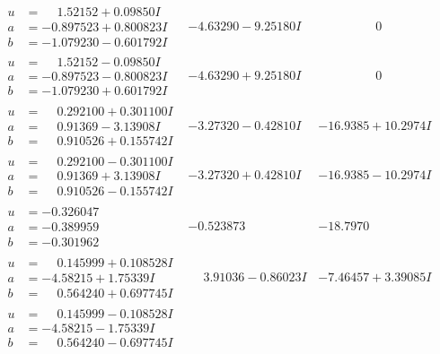 \documentclass[1p]{elsarticle_modified}
\theoremstyle{definition}
\begin{document}
$$\begin{array}{c|c|c}
\begin{aligned}
u &= \phantom{-}1.52152 + 0.09850 I \\
a &= -0.897523 + 0.800823 I \\
b &= -1.079230 - 0.601792 I\end{aligned}
 & -4.63290 - 9.25180 I & \phantom{-0.000000 } 0 \\ \hline\begin{aligned}
u &= \phantom{-}1.52152 - 0.09850 I \\
a &= -0.897523 - 0.800823 I \\
b &= -1.079230 + 0.601792 I\end{aligned}
 & -4.63290 + 9.25180 I & \phantom{-0.000000 } 0 \\ \hline\begin{aligned}
u &= \phantom{-}0.292100 + 0.301100 I \\
a &= \phantom{-}0.91369 - 3.13908 I \\
b &= \phantom{-}0.910526 + 0.155742 I\end{aligned}
 & -3.27320 - 0.42810 I & -16.9385 + 10.2974 I \\ \hline\begin{aligned}
u &= \phantom{-}0.292100 - 0.301100 I \\
a &= \phantom{-}0.91369 + 3.13908 I \\
b &= \phantom{-}0.910526 - 0.155742 I\end{aligned}
 & -3.27320 + 0.42810 I & -16.9385 - 10.2974 I \\ \hline\begin{aligned}
u &= -0.326047\phantom{ +0.000000I} \\
a &= -0.389959\phantom{ +0.000000I} \\
b &= -0.301962\phantom{ +0.000000I}\end{aligned}
 & -0.523873\phantom{ +0.000000I} & -18.7970\phantom{ +0.000000I} \\ \hline\begin{aligned}
u &= \phantom{-}0.145999 + 0.108528 I \\
a &= -4.58215 + 1.75339 I \\
b &= \phantom{-}0.564240 + 0.697745 I\end{aligned}
 & \phantom{-}3.91036 - 0.86023 I & -7.46457 + 3.39085 I \\ \hline\begin{aligned}
u &= \phantom{-}0.145999 - 0.108528 I \\
a &= -4.58215 - 1.75339 I \\
b &= \phantom{-}0.564240 - 0.697745 I\end{aligned}

\end{array}$$
\end{document}
